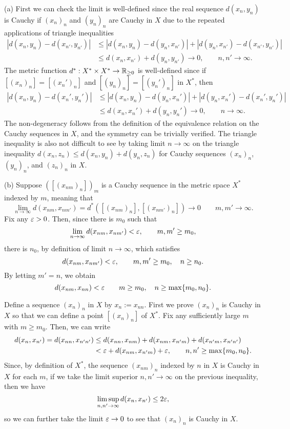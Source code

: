 \documentclass{../../large}
\begin{document}
\begin{pf}
(a)
First we can check the limit is well-defined since the real sequence $d(x_n,y_n)$ is Cauchy if $(x_n)_n$ and $(y_n)_n$ are Cauchy in $X$ due to the repeated applications of triangle inequalities
\begin{align*}
|d(x_n,y_n)-d(x_{n'},y_{n'})|
&\le|d(x_n,y_n)-d(y_n,x_{n'})|+|d(y_n,x_{n'})-d(x_{n'},y_{n'})|\\
&\le d(x_n,x_{n'})+d(y_n,y_{n'})\to0,\qquad n,n'\to\infty.
\end{align*}
The metric function $d^*:X^*\times X^*\to\mathbb{R}_{\ge0}$ is well-defined since if $[(x_n)_n]=[(x_n')_n]$ and $[(y_n)_n]=[(y_n')_n]$ in $X^*$, then
\begin{align*}
|d(x_n,y_n)-d(x_n',y_n')|
&\le|d(x_n,y_n)-d(y_n,x_n')|+|d(y_n,x_n')-d(x_n',y_n')|\\
&\le d(x_n,x_n')+d(y_n,y_n')\to0,\qquad n\to\infty.
\end{align*}
The non-degeneracy follows from the definition of the equivalence relation on the Cauchy sequences in $X$, and the symmetry can be trivially verified.
The triangle inequality is also not difficult to see by taking limit $n\to\infty$ on the triangle inequality $d(x_n,z_n)\le d(x_n,y_n)+d(y_n,z_n)$ for Cauchy sequences $(x_n)_n$, $(y_n)_n$, and $(z_n)_n$ in $X$.


(b)
Suppose $([(x_{nm})_n])_m$ is a Cauchy sequence in the metric space $X^*$ indexed by $m$, meaning that
\[\lim_{n\to\infty}d(x_{nm},x_{nm'})=d^*([(x_{nm})_n],[(x_{nm'})_n])\to0\qquad m,m'\to\infty.\]
Fix any $\varepsilon>0$.
Then, since there is $m_0$ such that
\[\lim_{n\to\infty}d(x_{nm},x_{nm'})<\varepsilon,\qquad m,m'\ge m_0,\]
there is $n_0$, by definition of limit $n\to\infty$, which satisfies
\[d(x_{nm},x_{nm'})<\varepsilon,\qquad m,m'\ge m_0,\quad n\ge n_0.\]
By letting $m'=n$, we obtain
\[d(x_{nm},x_{nn})<\varepsilon\qquad m\ge m_0,\quad n\ge\max\{m_0,n_0\}.\]

Define a sequence $(x_n)_n$ in $X$ by $x_n:=x_{nn}$.
First we prove $(x_n)_n$ is Cauchy in $X$ so that we can define a point $[(x_n)_n]$ of $X^*$.
Fix any sufficiently large $m$ with $m\ge m_0$.
Then, we can write
\begin{align*}
d(x_n,x_{n'})=d(x_{nn},x_{n'n'})&
\le d(x_{nn},x_{nm})+d(x_{nm},x_{n'm})+d(x_{n'm},x_{n'n'})\\
&<\varepsilon+d(x_{nm},x_{n'm})+\varepsilon,\qquad n,n'\ge\max\{m_0,n_0\}.
\end{align*}
Since, by definition of $X^*$, the sequence $(x_{nm})_n$ indexed by $n$ in $X$ is Cauchy in $X$ for each $m$, if we take the limit superior $n,n'\to\infty$ on the previous inequality, then we have
\[\limsup_{n,n'\to\infty}d(x_n,x_{n'})\le2\varepsilon,\]
so we can further take the limit $\varepsilon\to0$ to see that $(x_n)_n$ is Cauchy in $X$.


\end{pf}
\end{document}
